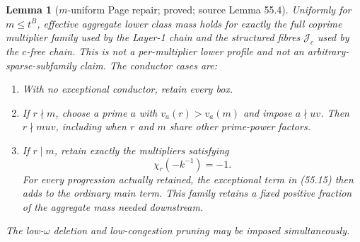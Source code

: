 \documentclass[10pt,reqno]{amsart}
\newtheorem{lemma}[theorem]{Lemma}
\theoremstyle{definition}
\newcommand{\1}{\mathbf 1}
\begin{document}
\begin{lemma}[$m$-uniform Page repair; proved; source Lemma 55.4]
\label{lem:m-Page}
Uniformly for $m\leq t^B$, effective aggregate lower class mass holds for
exactly the full coprime multiplier family used by the Layer-1 chain and the
structured fibres $\mathcal J_c$ used by the $c$-free chain.  This is not a
per-multiplier lower profile and not an arbitrary-sparse-subfamily claim.
The conductor cases are:
\begin{enumerate}[leftmargin=*,label=\arabic*.]
\item With no exceptional conductor, retain every box.
\item If $r\nmid m$, choose a prime $a$ with
$v_a(r)>v_a(m)$ and impose $a\nmid uv$.  Then $r\nmid muv$, including when
$r$ and $m$ share other prime-power factors.
\item If $r\mid m$, retain exactly the multipliers satisfying
\begin{equation}\tag{55.16}
                         \chi_r(-k^{-1})=-1.
\end{equation}
For every progression actually retained, the exceptional term in (55.15)
then adds to the ordinary main term.  This family retains a fixed positive
fraction of the aggregate mass needed downstream.
\end{enumerate}
The low-$\omega$ deletion and low-congestion pruning may be imposed
simultaneously.
\end{lemma}
\end{document}
